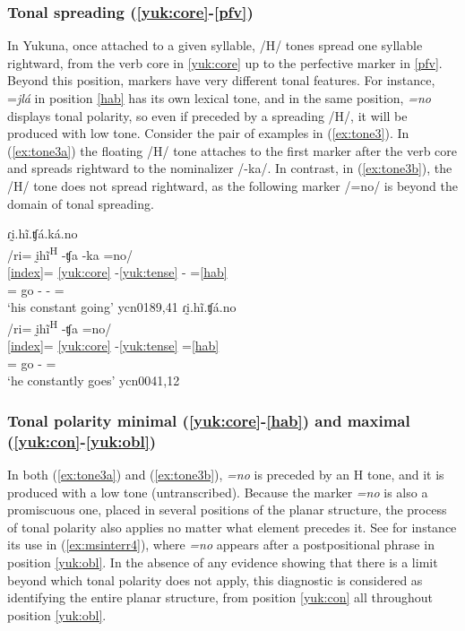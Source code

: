 \documentclass[output=paper]{langscibook}
\begin{document}
\subsubsection{Tonal spreading (\ref{yuk:core}-\ref{pfv})} \label{sss:spread}
In Yukuna, once attached to a given syllable, /H/ tones spread one syllable rightward, from the verb core in \ref{yuk:core} up to the perfective marker in \ref{pfv}. Beyond this position, markers have very different tonal features. For instance, =\textit{jlá} \Frust{} in position \ref{hab} has its own lexical tone, and in the same position, \textit{=no} \Hab{} displays tonal polarity, so even if preceded by a spreading /H/, it will be produced with low tone. Consider the pair of examples in (\ref{ex:tone3}). In (\ref{ex:tone3a}) the floating /H/ tone attaches to the first marker after the verb core and spreads rightward to the nominalizer \mbox{/-ka/.} In contrast, in (\ref{ex:tone3b}), the /H/ tone does not spread rightward, as the following marker /=no/ is beyond the domain of tonal spreading.

\ea \label{ex:tone3}
\ea \label{ex:tone3a}
ɾḭ.hĩ.ʧá.ká.no  \\
    \glll /ri= ḭhĩ\textsuperscript{H} -ʧa -ka =no/ \\
         \ref{index}= \ref{yuk:core} -\ref{yuk:tense} - =\ref{hab}\\
       \Tsg{}= go -\Pst{} -\Nmlz{} =\Hab{}\\
    \glt `his constant going' \hfill ycn0189,41
\ex \label{ex:tone3b}
ɾḭ.hĩ.ʧá.no  \\
  \glll /ri= ḭhĩ\textsuperscript{H} -ʧa =no/  \\
         \ref{index}= \ref{yuk:core} -\ref{yuk:tense} =\ref{hab} \\
       \Tsg{}= go -\Pst{} =\Hab{}\\
    \glt `he constantly goes' \hfill ycn0041,12
 \z
\z 

\subsubsection{Tonal polarity minimal (\ref{yuk:core}-\ref{hab}) and maximal (\ref{yuk:con}-\ref{yuk:obl})} \label{sss:polar}
In both (\ref{ex:tone3a}) and (\ref{ex:tone3b}), \textit{=no} \Hab{} is preceded by an H tone, and it is produced with a low tone (untranscribed). Because the marker \textit{=no} is also a promiscuous one, placed in several positions of the planar structure, the process of tonal polarity also applies no matter what element precedes it. See for instance its use in (\ref{ex:msinterr4}), where \textit{=no} appears after a postpositional phrase in position \ref{yuk:obl}. In the absence of any evidence showing that there is a limit beyond which tonal polarity does not apply, this diagnostic is considered as identifying the entire planar structure, from position \ref{yuk:con} all throughout position \ref{yuk:obl}.
\end{document}
